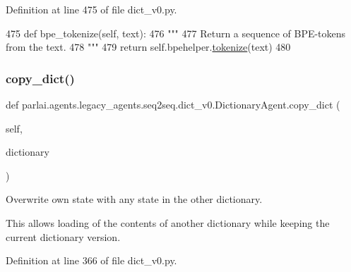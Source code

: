 Definition at line 475 of file dict\+\_\+v0.\+py.


\begin{DoxyCode}
475     \textcolor{keyword}{def }bpe\_tokenize(self, text):
476         \textcolor{stringliteral}{"""}
477 \textcolor{stringliteral}{        Return a sequence of BPE-tokens from the text.}
478 \textcolor{stringliteral}{        """}
479         \textcolor{keywordflow}{return} self.bpehelper.\hyperlink{namespaceparlai_1_1agents_1_1tfidf__retriever_1_1build__tfidf_a1fdb457e98eb4e4c26047e229686a616}{tokenize}(text)
480 
\end{DoxyCode}
\mbox{\label{classparlai_1_1agents_1_1legacy__agents_1_1seq2seq_1_1dict__v0_1_1DictionaryAgent_a56e9c7a8f20652b9dff0fc3c495b6dcf}} 
\subsubsection{\texorpdfstring{copy\+\_\+dict()}{copy\_dict()}}
{\footnotesize\ttfamily def parlai.\+agents.\+legacy\+\_\+agents.\+seq2seq.\+dict\+\_\+v0.\+Dictionary\+Agent.\+copy\+\_\+dict (\begin{DoxyParamCaption}\item[{}]{self,  }\item[{}]{dictionary }\end{DoxyParamCaption})}

\begin{DoxyVerb}Overwrite own state with any state in the other dictionary.

This allows loading of the contents of another dictionary while keeping the
current dictionary version.
\end{DoxyVerb}
 

Definition at line 366 of file dict\+\_\+v0.\+py.


